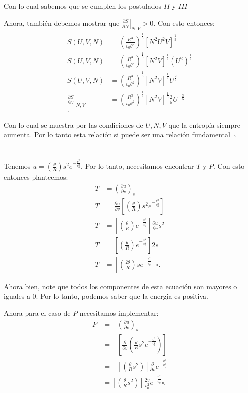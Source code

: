 \documentclass{report}
\begin{document}
Con lo cual sabemos que se cumplen los postulados $II$ y  $III$

Ahora, también debemos mostrar que $\left. \frac{\partial S}{\partial N}  \right|_{N, V} > 0 $. Con esto entonces:
  \begin{align*}
  S\left( U, V, N \right) &= \left( \frac{R^{3}}{v_0 \theta^2} \right)^{\frac{1}{5}} \left[ N^2 U^2 V \right]^{\frac{1}{5}} \\
  S\left( U, V, N \right) &= \left( \frac{R^{3}}{v_0 \theta^2} \right)^{\frac{1}{5}} \left[ N^2  V \right]^{\frac{1}{5}} \left( U^2 \right)^{\frac{1}{5}}  \\
  S\left( U, V, N \right) &= \left( \frac{R^{3}}{v_0 \theta^2} \right)^{\frac{1}{5}} \left[ N^2  V \right]^{\frac{1}{5}} U^{\frac{2}{5}}  \\
  \left. \frac{\partial S}{\partial U}  \right|_{N, V} &= \left( \frac{R^{3}}{v_0 \theta^2} \right)^{\frac{1}{5}} \left[ N^2  V \right]^{\frac{1}{5}} \frac{2}{5}U^{-\frac{3}{5}} \\
  .\end{align*}

  Con lo cual se muestra por las condiciones de $U, N, V$ que la entropía siempre aumenta. Por lo tanto esta relación si puede ser una relación fundamental $\square$.

\chapter{}

Tenemos $u = \left(\frac{\theta}{R}\right)s^2 e^{- \frac{v^2}{v_0^2}}$. Por lo tanto, necesitamos encontrar $T$ y $P$. Con esto entonces planteemos:
\begin{align*}
  T &= \left(\frac{\partial u}{\partial v}\right)_s \\
  T &= \frac{\partial u}{\partial v} \left[ \left( \frac{\theta}{R} \right)s^2 e^{- \frac{v^2}{v^2_0}} \right] \\
  T &= \left[ \left( \frac{\theta}{R} \right)e^{- \frac{v^2}{v^2_0}} \right] \frac{\partial u}{\partial v} s^2 \\
  T &= \left[ \left( \frac{\theta}{R} \right)e^{- \frac{v^2}{v^2_0}} \right]  2 s \\
  T &= \left[ \left( \frac{2\theta}{R} \right) s e^{- \frac{v^2}{v^2_0}} \right] \square.
\end{align*}

Ahora bien, note que todos los componentes de esta ecuación son mayores o iguales a 0. Por lo tanto, podemos saber que la energia es positiva.

Ahora para el caso de $P$ necesitamos implementar:
\begin{align*}
  P &= - \left( \frac{\partial u}{\partial v} \right)_s \\
  &= - \left[ \frac{\partial}{\partial v} \left( \frac{\theta}{R} s^2 e^{- \frac{v^2}{v_0^2}} \right) \right]\\
  &= - \left[ \left( \frac{\theta}{R} s^2 \right) \right]\frac{\partial}{\partial v} e^{- \frac{v^2}{v_0^2}}\\
  &= \left[ \left( \frac{\theta}{R} s^2 \right) \right]\frac{2v}{v_0^2} e^{- \frac{v^2}{v_0^2}} \square.
\end{align*}
\end{document}
